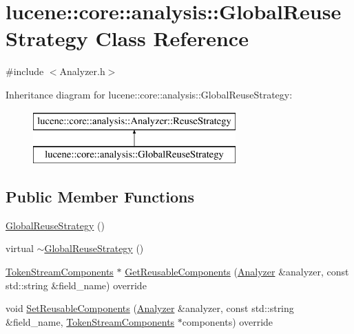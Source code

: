 \hypertarget{classlucene_1_1core_1_1analysis_1_1GlobalReuseStrategy}{}\section{lucene\+:\+:core\+:\+:analysis\+:\+:Global\+Reuse\+Strategy Class Reference}
\label{classlucene_1_1core_1_1analysis_1_1GlobalReuseStrategy}


{\ttfamily \#include $<$Analyzer.\+h$>$}

Inheritance diagram for lucene\+:\+:core\+:\+:analysis\+:\+:Global\+Reuse\+Strategy\+:\begin{figure}[H]
\begin{center}
\leavevmode
\includegraphics[height=2.000000cm]{classlucene_1_1core_1_1analysis_1_1GlobalReuseStrategy}
\end{center}
\end{figure}
\subsection*{Public Member Functions}
\begin{DoxyCompactItemize}
\item 
\mbox{\hyperlink{classlucene_1_1core_1_1analysis_1_1GlobalReuseStrategy_ac91815e66d775fd48aad17fb5a78d266}{Global\+Reuse\+Strategy}} ()
\item 
virtual \mbox{\hyperlink{classlucene_1_1core_1_1analysis_1_1GlobalReuseStrategy_a536f4c3459f19db2a356e6cedb575c1a}{$\sim$\+Global\+Reuse\+Strategy}} ()
\item 
\mbox{\hyperlink{classlucene_1_1core_1_1analysis_1_1TokenStreamComponents}{Token\+Stream\+Components}} $\ast$ \mbox{\hyperlink{classlucene_1_1core_1_1analysis_1_1GlobalReuseStrategy_a79b31d1f8bf9bec685377f6dbff3c5ba}{Get\+Reusable\+Components}} (\mbox{\hyperlink{classlucene_1_1core_1_1analysis_1_1Analyzer}{Analyzer}} \&analyzer, const std\+::string \&field\+\_\+name) override
\item 
void \mbox{\hyperlink{classlucene_1_1core_1_1analysis_1_1GlobalReuseStrategy_a168d01df604559cb787781ad0ab7d7c2}{Set\+Reusable\+Components}} (\mbox{\hyperlink{classlucene_1_1core_1_1analysis_1_1Analyzer}{Analyzer}} \&analyzer, const std\+::string \&field\+\_\+name, \mbox{\hyperlink{classlucene_1_1core_1_1analysis_1_1TokenStreamComponents}{Token\+Stream\+Components}} $\ast$components) override
\end{DoxyCompactItemize}
